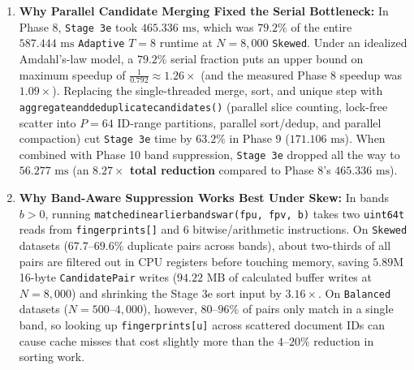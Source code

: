\documentclass[11pt,a4paper]{article}
\renewcommand{\_}{\textunderscore\allowbreak}
\begin{document}
\begin{enumerate}
\begin{itemize}
        \item \textbf{Why Fixed \texttt{Dynamic} (\texttt{chunk\_size = 0}) Slows Down in Stage 4 Verification:} In \texttt{run\_parallel\_pipeline}, \texttt{SchedulePolicy::Dynamic} with default chunk size $1$ hands out all $2,727,152$ candidate checks one pair at a time through OpenMP's atomic work queue. This causes Stage 4 at $N=8,000, T=8$ to jump from $36.684\text{ ms}$ (\texttt{Sequential}) to $438.793\text{ ms}$ (Base) and $408.302\text{ ms}$ (Supp). \texttt{Adaptive} avoids this problem by using static scheduling for Stages 1 and 4 ($39.655\text{--}40.005\text{ ms}$ at $T=8$), where every item takes the same amount of work.
    \end{itemize}

    \item \textbf{Why Parallel Candidate Merging Fixed the Serial Bottleneck:}
    In Phase 8, \texttt{Stage 3e} took $465.336\text{ ms}$, which was $79.2\%$ of the entire $587.444\text{ ms}$ \texttt{Adaptive} $T=8$ runtime at $N=8,000$ \texttt{Skewed}. Under an idealized Amdahl's-law model, a $79.2\%$ serial fraction puts an upper bound on maximum speedup of $\frac{1}{0.792} \approx 1.26\times$ (and the measured Phase 8 speedup was $1.09\times$). Replacing the single-threaded merge, sort, and unique step with \texttt{aggregate\_and\_deduplicate\_candidates()} (parallel slice counting, lock-free scatter into $P = 64$ ID-range partitions, parallel sort/dedup, and parallel compaction) cut \texttt{Stage 3e} time by $63.2\%$ in Phase 9 ($171.106\text{ ms}$). When combined with Phase 10 band suppression, \texttt{Stage 3e} dropped all the way to $56.277\text{ ms}$ (an \textbf{$8.27\times$ total reduction} compared to Phase 8's $465.336\text{ ms}$).

    \item \textbf{Why Band-Aware Suppression Works Best Under Skew:}
    In bands $b > 0$, running \texttt{matched\_in\_earlier\_band\_swar(fp\_u, fp\_v, b)} takes two \texttt{uint64\_t} reads from \texttt{fingerprints[]} and 6 bitwise/arithmetic instructions. On \texttt{Skewed} datasets ($67.7\text{--}69.6\%$ duplicate pairs across bands), about two-thirds of all pairs are filtered out in CPU registers before touching memory, saving $5.89\text{M}$ 16-byte \texttt{CandidatePair} writes ($94.22\text{ MB}$ of calculated buffer writes at $N=8,000$) and shrinking the Stage 3e sort input by $3.16\times$. On \texttt{Balanced} datasets ($N=500\text{--}4,000$), however, $80\text{--}96\%$ of pairs only match in a single band, so looking up \texttt{fingerprints[u]} across scattered document IDs can cause cache misses that cost slightly more than the $4\text{--}20\%$ reduction in sorting work.


\end{enumerate}
\end{document}
